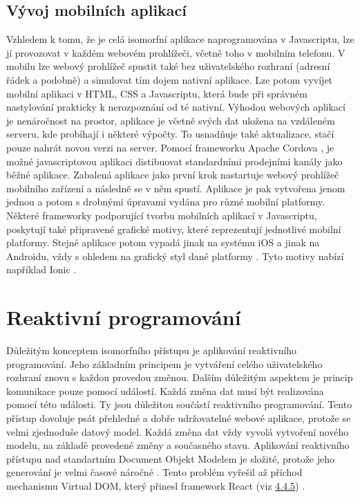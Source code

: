 \subsection{Vývoj mobilních aplikací}
Vzhledem k tomu, že je celá isomorfní aplikace naprogramována v Javascriptu, lze jí provozovat v každém webovém prohlížeči, včetně toho v mobilním telefonu. V mobilu lze webový prohlížeč spustit také bez uživatelského rozhraní (adresní řádek a podobně) a simulovat tím dojem nativní aplikace. Lze potom vyvíjet mobilní aplikaci v HTML, CSS a Javascriptu, která bude při správném nastylování prakticky k nerozpoznání od té nativní. Výhodou webových aplikací je nenáročnost na prostor, aplikace je včetně svých dat uložena na vzdáleném serveru, kde probíhají i některé výpočty. To usnadňuje také aktualizace, stačí pouze nahrát novou verzi na server. Pomocí frameworku Apache Cordova \cite{cordova}, je možné javascriptovou aplikaci distibuovat standardními prodejními kanály jako běžné aplikace. Zabalená aplikace jako první krok nastartuje webový prohlížeč mobilního zařízení a následně se v něm spustí. Aplikace je pak vytvořena jenom jednou a potom s drobnými úpravami vydána pro různé mobilní platformy. Některé frameworky podporující tvorbu mobilních aplikací v Javascriptu, poskytují také připravené grafické motivy, které reprezentují jednotlivé mobilní platformy. Stejné aplikace potom vypadá jinak na systému iOS a jinak na Androidu, vždy s ohledem na grafický styl dané platformy \cite{mobile_apps}. Tyto motivy nabízí například Ionic \cite{ionic}.

\section{Reaktivní programování}
Důležitým konceptem isomorfního přístupu je aplikování reaktivního programování. Jeho základním principem je vytváření celého uživatelského rozhraní znovu s každou provedou změnou. Dalším důležitým aspektem je princip komunikace pouze pomocí událostí. Každá změna dat musí být realizována pomocí této události. Ty jsou důležitou součástí reaktivního programování. Tento přístup dovoluje psát přehledné a dobře udržovatelné webové aplikace, protože se velmi zjednoduše datový model. Každá změna dat vždy vyvolá vytvoření nového modelu, na základě provedené změny a současného stavu. Aplikování reaktivního přístupu nad standartním Document Objekt Modelem je složité, protože jeho generování je velmi časové náročné \cite{isomorhic_book} \cite{codepicnic_universaljs}. Tento problém vyřešil až příchod mechanismu Virtual DOM, který přinesl framework React (viz \hyperref[sec:virtual_dom]{4.4.5}) \cite{virtualdom}.

